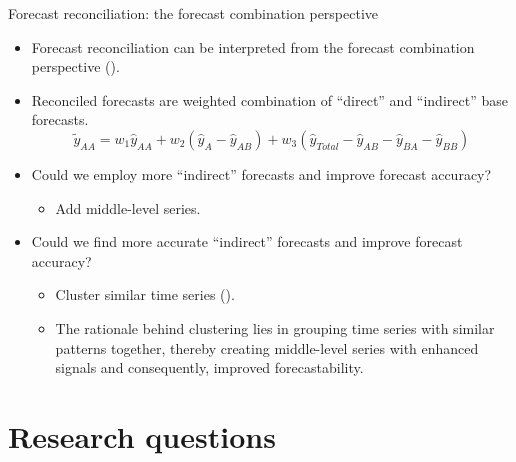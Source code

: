 \documentclass[aspectratio=169]{beamer}
\begin{document}
\begin{frame}{Forecast reconciliation: the forecast combination perspective}

	\begin{itemize}
		\item Forecast reconciliation can be interpreted from the forecast combination perspective (\citealp{hollymanUnderstandingForecastReconciliation2021,difonzoForecastCombinationbasedForecast2024}).
		\item Reconciled forecasts are weighted combination of ``direct'' and ``indirect'' base forecasts. 
		\[
			\tilde{y}_{AA} = w_1 \hat y_{AA} + w_2 (\hat y_{A} -\hat y_{AB}) + w_3 (\hat y_{Total} - \hat y_{AB} - \hat y_{BA} - \hat y_{BB})
		\]
	
		\item Could we employ {\color{red} more ``indirect'' forecasts} and improve forecast accuracy?
		\begin{itemize}
			\item Add middle-level series.
		\end{itemize}
		\item Could we find {\color{red} more accurate ``indirect'' forecasts} and improve forecast accuracy?
		\begin{itemize}
			\item Cluster similar time series (\citealp{liForecastReconciliationApproach2019,pangHierarchicalElectricityTime2022,matteraImprovingOutofSampleForecasts2023}).
			\item The rationale behind clustering lies in grouping time series with similar patterns together, thereby creating middle-level series with enhanced signals and consequently, improved forecastability.
		\end{itemize}
	\end{itemize}
		
	\end{frame}
	

\section{Research questions}
\end{document}
